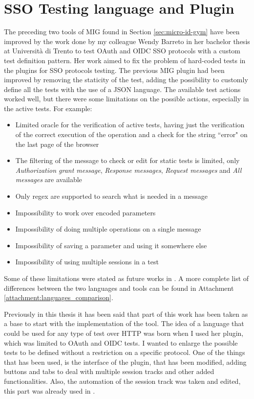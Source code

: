\section{SSO Testing language and Plugin}
The preceding two tools of MIG found in Section \ref{sec:micro-id-gym} have been improved by the work done by my colleague Wendy Barreto \cite{wendy_barreto} in her bachelor thesis at Università di Trento to test \gls{OAuth} and \gls{OIDC} SSO protocols with a custom test definition pattern. Her work aimed to fix the problem of hard-coded tests in the plugins for SSO protocols testing. The previous MIG plugin had been improved by removing the staticity of the test, adding the possibility to customly define all the tests with the use of a JSON language.
The available test actions worked well, but there were some limitations on the possible actions, especially in the active tests. For example:
\begin{itemize}
    \item Limited oracle for the verification of active tests, having just the verification of the correct execution of the operation and a check for the string ``error" on the last page of the browser
    \item The filtering of the message to check or edit for static tests is limited, only \textit{Authorization grant message}, \textit{Response messages}, \textit{Request messages} and \textit{All messages} are available
    \item Only regex are supported to search what is needed in a message
    \item Impossibility to work over encoded parameters
    \item Impossibility of doing multiple operations on a single message
    \item Impossibility of saving a parameter and using it somewhere else
    \item Impossibility of using multiple sessions in a test
\end{itemize}
Some of these limitations were stated as future works in \cite{wendy_barreto}. A more complete list of differences between the two languages and tools can be found in Attachment \ref{attachment:languages_comparison}.

Previously in this thesis it has been said that part of this work has been taken as a base to start with the implementation of the tool. The idea of a language that could be used for any type of test over HTTP was born when I used her plugin, which was limited to \gls{OAuth} and \gls{OIDC} tests. I wanted to enlarge the possible tests to be defined without a restriction on a specific protocol. 
One of the things that has been used, is the interface of the plugin, that has been modified, adding buttons and tabs to deal with multiple \gls{session track}s and other added functionalities. Also, the automation of the \gls{session track} was taken and edited, this part was already used in \cite{claudio_grisenti,stefano_facchini}.

